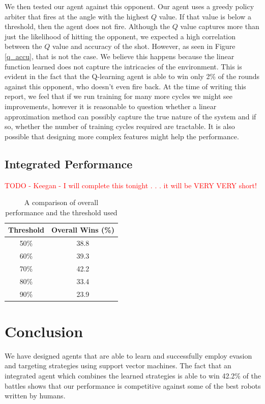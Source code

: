 \documentclass{article}
\newcommand{\xxx}[1]{\textcolor{red}{#1}}
\theoremstyle{plain}
\theoremstyle{definition}
\theoremstyle{remark}
\begin{document}
We then tested our agent against this opponent. Our agent uses a greedy policy arbiter that fires at the angle with the highest $Q$ value. If that value is below a threshold, then the agent does not fire. Although the $Q$ value captures more than just the likelihood of hitting the opponent, we expected a high correlation between the $Q$ value and accuracy of the shot. However, as seen in Figure \ref{q_accu}, that is not the case. We believe this happens because the linear function learned does not capture the intricacies of the environment. This is evident in the fact that the Q-learning agent is able to win only 2\% of the rounds against this opponent, who doesn't even fire back. At the time of writing this report, we feel that if we run training for many more cycles we might see improvements, however it is reasonable to question whether a linear approximation method can possibly capture the true nature of the system and if so, whether the number of training cycles required are tractable. It is also possible that designing more complex features might help the performance.

\subsection*{Integrated Performance}
\xxx{TODO - Keegan - I will complete this tonight . . . it will be VERY VERY short!}

\begin{table}[h]
\centering
    \begin{tabular}{|c|c|}
        \hline
        \bf{Threshold} & \bf{Overall Wins (\%) }\\ \hline
        50\%      & 38.8   \\ \hline
        60\%      & 39.3   \\ \hline
        70\%      & 42.2   \\ \hline
        80\%      & 33.4   \\ \hline
        90\%      & 23.9   \\
        \hline
    \end{tabular}
\label{svm_thresh}
\caption{A comparison of overall performance and the threshold used}
\end{table}

\section{Conclusion}
We have designed agents that are able to learn and successfully employ evasion and targeting strategies using support vector machines. The fact that an integrated agent which combines the learned strategies is able to win 42.2\% of the battles shows that our performance is competitive against some of the best robots written by humans. 
\end{document}
